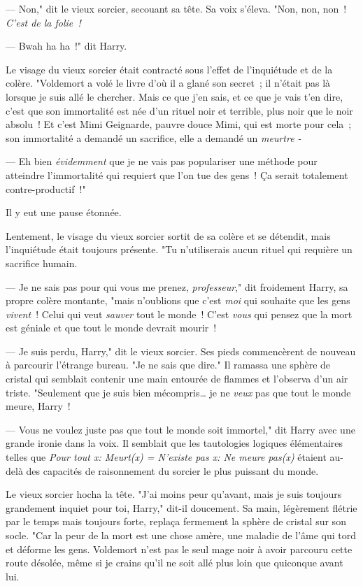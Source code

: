 --- Non," dit le vieux sorcier, secouant sa tête. Sa voix s'éleva. "Non, non, non~! \emph{C'est de la folie~!}

--- Bwah ha ha~!" dit Harry.

Le visage du vieux sorcier était contracté sous l'effet de l'inquiétude et de la colère. "Voldemort a volé le livre d'où il a glané son secret~; il n'était pas là lorsque je suis allé le chercher. Mais ce que j'en sais, et ce que je vais t'en dire, c'est que son immortalité est née d'un rituel noir et terrible, plus noir que le noir absolu~! Et c'est Mimi Geignarde, pauvre douce Mimi, qui est morte pour cela~; son immortalité a demandé un sacrifice, elle a demandé un \emph{meurtre -}

--- Eh bien \emph{évidemment} que je ne vais pas populariser une méthode pour atteindre l'immortalité qui requiert que l'on tue des gens~! Ça serait totalement contre-productif~!"

Il y eut une pause étonnée.

Lentement, le visage du vieux sorcier sortit de sa colère et se détendit, mais l'inquiétude était toujours présente. "Tu n'utiliserais aucun rituel qui requière un sacrifice humain.

--- Je ne sais pas pour qui vous me prenez, \emph{professeur}," dit froidement Harry, sa propre colère montante, "mais n'oublions que c'est \emph{moi} qui souhaite que les gens \emph{vivent}~! Celui qui veut \emph{sauver} tout le monde~! C'est \emph{vous} qui pensez que la mort est géniale et que tout le monde devrait mourir~!

--- Je suis perdu, Harry," dit le vieux sorcier. Ses pieds commencèrent de nouveau à parcourir l'étrange bureau. "Je ne sais que dire." Il ramassa une sphère de cristal qui semblait contenir une main entourée de flammes et l'observa d'un air triste. "Seulement que je suis bien mécompris… je ne \emph{veux} pas que tout le monde meure, Harry~!

--- Vous ne voulez juste pas que tout le monde soit immortel," dit Harry avec une grande ironie dans la voix. Il semblait que les tautologies logiques élémentaires telles que \emph{Pour tout x: Meurt(x) = N'existe pas x: Ne meure pas(x)} étaient au-delà des capacités de raisonnement du sorcier le plus puissant du monde.

Le vieux sorcier hocha la tête. "J'ai moins peur qu'avant, mais je suis toujours grandement inquiet pour toi, Harry," dit-il doucement. Sa main, légèrement flétrie par le temps mais toujours forte, replaça fermement la sphère de cristal sur son socle. "Car la peur de la mort est une chose amère, une maladie de l'âme qui tord et déforme les gens. Voldemort n'est pas le seul mage noir à avoir parcouru cette route désolée, même si je crains qu'il ne soit allé plus loin que quiconque avant lui.

